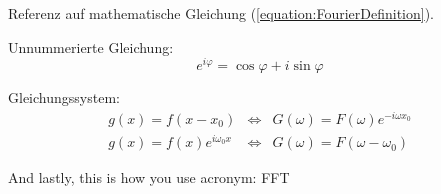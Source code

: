 Referenz auf mathematische Gleichung (\ref{equation:FourierDefinition}).

Unnummerierte Gleichung:
\begin{equation*}
	e^{i\varphi} = \cos\varphi + i \sin\varphi
\end{equation*}

Gleichungssystem:
\begin{eqnarray}
	g(x) = f(x - x_0) & \Leftrightarrow &
		G(\omega) = F(\omega) e^{-i\omega x_0} \\
	g(x) = f(x) e^{i\omega_0 x} & \Leftrightarrow &
		G(\omega) = F(\omega - \omega_0)
\end{eqnarray}

And lastly, this is how you use acronym: \gls{FFT}